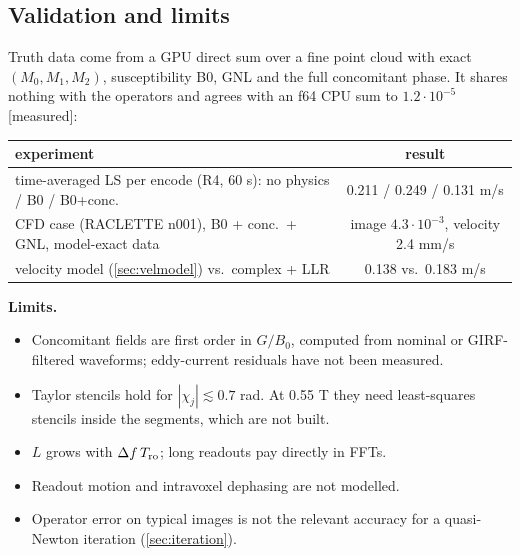 \documentclass[11pt]{article}
\theoremstyle{remark}
\begin{document}
\subsection{Validation and limits}
\label{sec:validation}

Truth data come from a GPU direct sum over a fine point cloud with exact $(M_0,M_1,M_2)$, susceptibility B0, GNL and the full concomitant phase. It shares nothing with the operators and agrees with an f64 CPU sum to $1.2\cdot10^{-5}$ [measured]:
\begin{center}\small
\begin{tabular}{lc}
\toprule
experiment & result\\
\midrule
time-averaged LS per encode (R4, 60 s): no physics / B0 / B0+conc. & 0.211 / 0.249 / 0.131 m/s\\
CFD case (RACLETTE n001), B0 + conc.\ + GNL, model-exact data & image $4.3\cdot10^{-3}$, velocity 2.4 mm/s\\
velocity model (\cref{sec:velmodel}) vs.\ complex + LLR & 0.138 vs.\ 0.183 m/s\\
\bottomrule
\end{tabular}
\end{center}
\textbf{Limits.}
\begin{itemize}
  \item Concomitant fields are first order in $G/B_0$, computed from nominal or GIRF-filtered waveforms; eddy-current residuals have not been measured.
  \item Taylor stencils hold for $|\chi_j|\lesssim0.7$ rad. At 0.55 T they need least-squares stencils inside the segments, which are not built.
  \item $L$ grows with $\Delta f\,T_{\rm ro}$; long readouts pay directly in FFTs.
  \item Readout motion and intravoxel dephasing are not modelled.
  \item Operator error on typical images is not the relevant accuracy for a quasi-Newton iteration (\cref{sec:iteration}).
\end{itemize}
\end{document}
